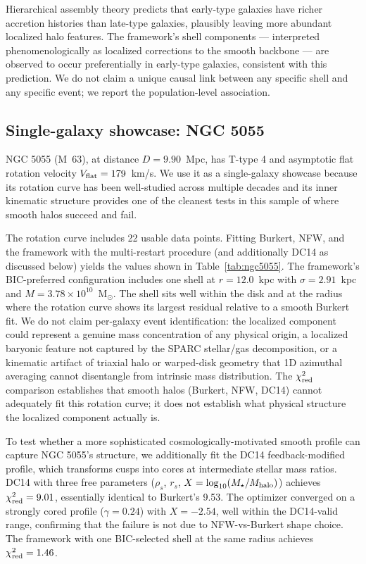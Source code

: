 Hierarchical assembly theory predicts that early-type galaxies have richer accretion histories than late-type galaxies, plausibly leaving more abundant localized halo features. The framework's shell components --- interpreted phenomenologically as localized corrections to the smooth backbone --- are observed to occur preferentially in early-type galaxies, consistent with this prediction. We do not claim a unique causal link between any specific shell and any specific event; we report the population-level association.

\subsection{Single-galaxy showcase: NGC 5055}
\label{sec:ngc5055}

NGC 5055 (M~63), at distance $D = 9.90$~Mpc, has T-type 4 and asymptotic flat rotation velocity $V_{\rm flat} = 179$~km/s. We use it as a single-galaxy showcase because its rotation curve has been well-studied across multiple decades and its inner kinematic structure provides one of the cleanest tests in this sample of where smooth halos succeed and fail.

The rotation curve includes 22 usable data points. Fitting Burkert, NFW, and the framework with the multi-restart procedure (and additionally DC14 as discussed below) yields the values shown in Table~\ref{tab:ngc5055}. The framework's BIC-preferred configuration includes one shell at $r = 12.0$~kpc with $\sigma = 2.91$~kpc and $M = 3.78 \times 10^{10}$~M$_\odot$. The shell sits well within the disk and at the radius where the rotation curve shows its largest residual relative to a smooth Burkert fit. We do not claim per-galaxy event identification: the localized component could represent a genuine mass concentration of any physical origin, a localized baryonic feature not captured by the SPARC stellar/gas decomposition, or a kinematic artifact of triaxial halo or warped-disk geometry that 1D azimuthal averaging cannot disentangle from intrinsic mass distribution. The $\chi^2_{\rm red}$ comparison establishes that smooth halos (Burkert, NFW, DC14) cannot adequately fit this rotation curve; it does not establish what physical structure the localized component actually is.

To test whether a more sophisticated cosmologically-motivated smooth profile can capture NGC 5055's structure, we additionally fit the DC14 \citep{DiCintio2014a,DiCintio2014b} feedback-modified profile, which transforms cusps into cores at intermediate stellar mass ratios. DC14 with three free parameters ($\rho_s$, $r_s$, $X = \log_{10}(M_\star/M_{\rm halo})$) achieves $\chi^2_{\rm red} = 9.01$, essentially identical to Burkert's 9.53. The optimizer converged on a strongly cored profile ($\gamma = 0.24$) with $X = -2.54$, well within the DC14-valid range, confirming that the failure is not due to NFW-vs-Burkert shape choice. The framework with one BIC-selected shell at the same radius achieves $\chi^2_{\rm red} = 1.46$.

